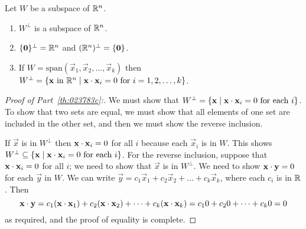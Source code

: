 \documentclass{ximera}
\begin{document}
\begin{theorem}\label{th:023783}
Let $W$ be a subspace of $\mathbb{R}^n$.
\begin{enumerate}
\item\label{th:023783a} $W^\perp$ is a subspace of $\mathbb{R}^n$.

\item\label{th:023783b} $\{\mathbf{0}\}^\perp = \mathbb{R}^n$ and $(\mathbb{R}^n)^\perp = \{\mathbf{0}\}$.

\item\label{th:023783c} If $W = \mbox{span}\left(\vec{x}_{1}, \vec{x}_{2}, \dots, \vec{x}_{k}\right)$ then $W^\perp = \{\mathbf{x} \mbox{ in } \mathbb{R}^n \mid \mathbf{x} \cdot \mathbf{x}_{i} = 0 \mbox{ for } i = 1, 2, \dots, k\}$.

\end{enumerate}
\end{theorem}

\begin{proof}[Proof of Part~\ref{th:023783c}:]
We must show that $W^\perp = \{\mathbf{x} \mid \mathbf{x} \cdot \mathbf{x}_{i} = 0 \mbox{ for each } i\}$.  To show that two sets are equal, we must show that all elements of one set are included in the other set, and then we must show the reverse inclusion.

If $\vec{x}$ is in $W^\perp$ then $\mathbf{x} \cdot \mathbf{x}_{i} = 0$ for all $i$ because each $\vec{x}_{i}$ is in $W$. This shows $W^\perp \subseteq \{\mathbf{x} \mid \mathbf{x} \cdot \mathbf{x}_{i} = 0 \mbox{ for each } i\}$. For the reverse inclusion, suppose that $\mathbf{x} \cdot \mathbf{x}_{i} = 0$ for all $i$; we need to show that $\vec{x}$ is in $W^\perp$.  We need to show $\mathbf{x} \cdot \mathbf{y} = 0$ for each $\vec{y}$ in $W$. We can write $\vec{y} = c_{1}\vec{x}_{1} + c_{2}\vec{x}_{2} + \dots  + c_{k}\vec{x}_{k}$, where each $c_{i}$ is in $\mathbb{R}$. Then
\begin{equation*}
\mathbf{x} \cdot \mathbf{y} = c_{1}(\mathbf{x} \cdot \mathbf{x}_{1}) + c_{2}(\mathbf{x} \cdot \mathbf{x}_{2})+ \dots +c_{k}(\mathbf{x} \cdot \mathbf{x}_{k}) = c_{1}0 + c_{2}0 + \dots + c_{k}0 = 0
\end{equation*}
 as required, and the proof of equality is complete.

\end{proof}
\end{document}

